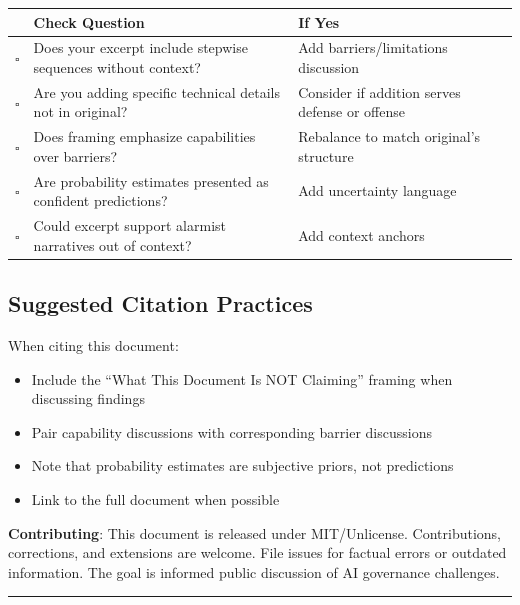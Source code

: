 \documentclass[11pt,letterpaper]{article}
\begin{document}
\begin{center}
\small
\begin{tabular}{L{0.5cm}L{6cm}L{5.5cm}}
\toprule
& \textbf{Check Question} & \textbf{If Yes} \\
\midrule
$\square$ & Does your excerpt include stepwise sequences without context? & Add barriers/limitations discussion \\
$\square$ & Are you adding specific technical details not in original? & Consider if addition serves defense or offense \\
$\square$ & Does framing emphasize capabilities over barriers? & Rebalance to match original's structure \\
$\square$ & Are probability estimates presented as confident predictions? & Add uncertainty language \\
$\square$ & Could excerpt support alarmist narratives out of context? & Add context anchors \\
\bottomrule
\end{tabular}
\end{center}

\subsection*{Suggested Citation Practices}

When citing this document:
\begin{itemize}
  \item Include the ``What This Document Is NOT Claiming'' framing when discussing findings
  \item Pair capability discussions with corresponding barrier discussions
  \item Note that probability estimates are subjective priors, not predictions
  \item Link to the full document when possible
\end{itemize}

\textbf{Contributing}: This document is released under MIT/Unlicense. Contributions, corrections, and extensions are welcome. File issues for factual errors or outdated information. The goal is informed public discussion of AI governance challenges.


\begin{center}
\rule{0.6\textwidth}{0.5pt}
\end{center}
\end{document}
